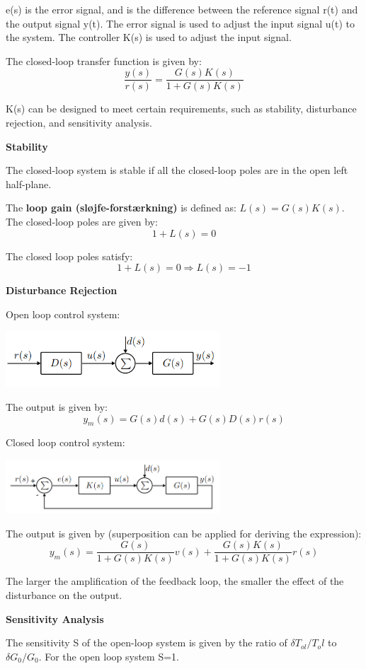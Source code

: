 e(s) is the error signal, and is the difference between the reference signal r(t) and the output signal y(t).
The error signal is used to adjust the input signal u(t) to the system. The controller K(s) is used to adjust the input signal.

The closed-loop transfer function is given by:
$$\frac{y(s)}{r(s)} = \frac{G(s)K(s)}{1+G(s)K(s)}$$

K(s) can be designed to meet certain requirements, such as stability, disturbance rejection, and sensitivity analysis.


\textbf{Stability}

The closed-loop system is stable if all the closed-loop poles are in the open left half-plane.

The \textbf{loop gain (sløjfe-forstærkning)} is defined as: $L(s) = G(s)K(s)$. The closed-loop poles are given by:
$$1+L(s) = 0$$

The closed loop poles satisfy:
$$1+L(s) = 0 \Rightarrow L(s) = -1$$

\textbf{Disturbance Rejection}

Open loop control system:
\begin{center}
	\includegraphics[width=0.6\textwidth]{Images/openLoop.png}
\end{center}
The output is given by:
$$y_m(s)=G(s)d(s)+G(s)D(s)r(s)$$


Closed loop control system:
\begin{center}
	\includegraphics[width=0.6\textwidth]{Images/closedLoop.png}
\end{center}
The output is given by (superposition can be applied for deriving the expression):
$$y_m(s) = \frac{G(s)}{1+G(s)K(s)}v(s) + \frac{G(s)K(s)}{1+G(s)K(s)}r(s)$$

The larger the amplification of the feedback loop, the smaller the effect of the disturbance on the output.


\textbf{Sensitivity Analysis}

The sensitivity S of the open-loop system is given by the ratio of $\delta T_{ol}/T_ol$ to $\delta G_0/G_0$.
For the open loop system S=1.

